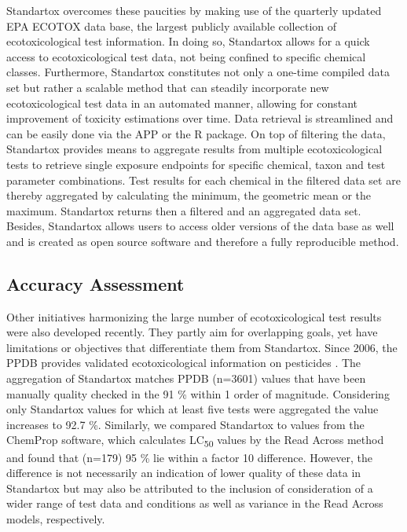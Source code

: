 Standartox overcomes these paucities by making use of the quarterly updated EPA ECOTOX data base, the largest publicly available collection of ecotoxicological test information. In doing so, Standartox allows for a quick access to ecotoxicological test data, not being confined to specific chemical classes. Furthermore, Standartox constitutes not only a one-time compiled data set but rather a scalable method that can steadily incorporate new ecotoxicological test data in an automated manner, allowing for constant improvement of toxicity estimations over time. Data retrieval is streamlined and can be easily done via the APP or the R package. On top of filtering the data, Standartox provides means to aggregate results from multiple ecotoxicological tests to retrieve single exposure endpoints for specific chemical, taxon and test parameter combinations. Test results for each chemical in the filtered data set are thereby aggregated by calculating the minimum, the geometric mean or the maximum. Standartox returns then a filtered and an aggregated data set. Besides, Standartox allows users to access older versions of the data base as well and is created as open source software and therefore a fully reproducible method.

\subsection{Accuracy Assessment}
Other initiatives harmonizing the large number of ecotoxicological test results were also developed recently. They partly aim for overlapping goals, yet have limitations or objectives that differentiate them from Standartox. Since 2006, the PPDB provides validated ecotoxicological information on pesticides \citep{lewis_international_2016}. The aggregation of Standartox matches PPDB (n=3601) values that have been manually quality checked in the 91 \% within 1 order of magnitude. Considering only Standartox values for which at least five tests were aggregated the value increases to 92.7 \%. Similarly, we compared Standartox to values from the ChemProp \citep{ufzdepartmentofecologicalchemistry_chemprop_2019} software, which calculates LC\textsubscript{50} values by the Read Across method \citep{schuurmann_quantitative_2011} and found that (n=179) 95 \% lie within a factor 10 difference. However, the difference is not necessarily an indication of lower quality of these data in Standartox but may also be attributed to the inclusion of consideration of a wider range of test data and conditions as well as variance in the Read Across models, respectively.




